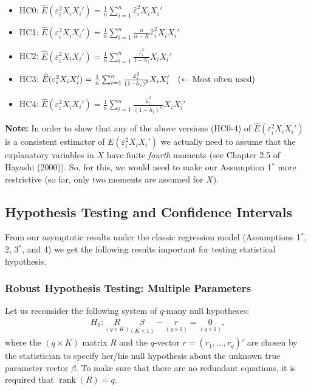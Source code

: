 \documentclass[
  letterpaper,
  DIV=11,
  numbers=noendperiod]{scrreprt}
\providecommand{\tightlist}{%
  \setlength{\itemsep}{0pt}\setlength{\parskip}{0pt}}\usepackage{longtable,booktabs,array}
\theoremstyle{definition}
\theoremstyle{plain}
\theoremstyle{plain}
\theoremstyle{remark}
\begin{document}
{\begin{itemize}
\tightlist
\item
  HC0:
  \(\widehat{E}(\varepsilon^2_iX_iX_i')=\frac{1}{n}\sum_{i=1}^n\hat\varepsilon_i^2X_iX_i'\)
\item
  HC1:
  \(\widehat{E}(\varepsilon^2_iX_iX_i')=\frac{1}{n}\sum_{i=1}^n\frac{n}{n-K}\hat\varepsilon_i^2X_iX_i'\)
\item
  HC2:
  \(\widehat{E}(\varepsilon^2_iX_iX_i')=\frac{1}{n}\sum_{i=1}^n\frac{\hat{\varepsilon}_{i}^{2}}{1-h_{i}}X_iX_i'\)
\item
  HC3:
  \(\widehat{E}(\varepsilon^2_iX_iX_i')=\frac{1}{n}\sum_{i=1}^n\frac{\hat{\varepsilon}_{i}^{2}}{\left(1-h_{i}\right)^{2}}X_iX_i'\text{\quad($\leftarrow$ Most often used)}\)
\item
  HC4:
  \(\widehat{E}(\varepsilon^2_iX_iX_i')=\frac{1}{n}\sum_{i=1}^n\frac{\hat{\varepsilon}_{i}^{2}}{\left(1-h_{i}\right)^{\delta_{i}}}X_iX_i'\)
\end{itemize}

\textbf{Note:} In order to show that any of the above versions (HC0-4)
of \(\widehat{E}(\varepsilon^2_iX_iX_i')\) is a consistent estimator of
\(E(\varepsilon^2_iX_iX_i')\) we actually need to assume that the
explanatory variables in \(X\) have finite \emph{fourth} moments (see
Chapter 2.5 of Hayashi (2000)). So, for this, we would need to make our
Assumption 1\(^\ast\) more restrictive (so far, only two moments are
assumed for \(X\)).

\hypertarget{hypothesis-testing-and-confidence-intervals}{%
\subsection{Hypothesis Testing and Confidence
Intervals}\label{hypothesis-testing-and-confidence-intervals}}

From our asymptotic results under the classic regression model
(Assumptions 1\(^\ast\), 2, 3\(^\ast\), and 4) we get the following
results important for testing statistical hypothesis.

\hypertarget{robust-hypothesis-testing-multiple-parameters}{%
\subsubsection{Robust Hypothesis Testing: Multiple
Parameters}\label{robust-hypothesis-testing-multiple-parameters}}

Let us reconsider the following system of \(q\)-many null hypotheses:
\begin{align*}
H_0: \underset{(q\times K)}{R}\underset{(K\times 1)}{\beta} - \underset{(q\times 1)}{r} = \underset{(q\times 1)}{0},
\end{align*} where the \((q \times K)\) matrix \(R\) and the
\(q\)-vector \(r=(r_{1},\dots,r_{q})'\) are chosen by the statistician
to specify her/his null hypothesis about the unknown true parameter
vector \(\beta\). To make sure that there are no redundant equations, it
is required that \(\operatorname{rank}(R)=q\).

}
\end{document}
